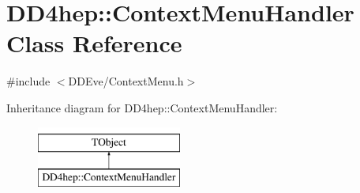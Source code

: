 \hypertarget{class_d_d4hep_1_1_context_menu_handler}{}\section{D\+D4hep\+:\+:Context\+Menu\+Handler Class Reference}
\label{class_d_d4hep_1_1_context_menu_handler}


{\ttfamily \#include $<$D\+D\+Eve/\+Context\+Menu.\+h$>$}

Inheritance diagram for D\+D4hep\+:\+:Context\+Menu\+Handler\+:\begin{figure}[H]
\begin{center}
\leavevmode
\includegraphics[height=2.000000cm]{class_d_d4hep_1_1_context_menu_handler}
\end{center}
\end{figure}

